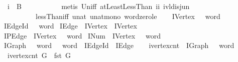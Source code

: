 \begin{isabellebody}
\ \ {\isachardoublequoteopen}i\ {\isasymin}\ {\isacharquery}B{\isachardoublequoteclose}\ \ \ \isanewline
\ \ \ \ \ \ \isamarkupfalse%
\ {\isacharparenleft}metis\ Un{\isacharunderscore}iff\ atLeast{}LessThan\ ii\ ivl{\isacharunderscore}disj{\isacharunderscore}un{\isacharparenleft}{}{\isacharparenright}\ \isanewline
\ \ \ \ \ \ \ \ \ \ lessThan{\isacharunderscore}iff\ unat{\isacharunderscore}{}\ unat{\isacharunderscore}mono\ word{\isacharunderscore}zero{\isacharunderscore}le{\isacharparenright}\isanewline
\ \ \isamarkupfalse%
\isanewline
{}\isamarkupfalse%
%
\endisatagproof
{\isafoldproof}%
%
\isadelimproof
\isanewline
%
\endisadelimproof
\isanewline
\isanewline
{}\isamarkupfalse%
\ IVertex\ {\isacharequal}\ {\isachardoublequoteopen}{}{}\ word{\isachardoublequoteclose}\isanewline
{}\isamarkupfalse%
\ IEdge{\isacharunderscore}Id\ {\isacharequal}\ {\isachardoublequoteopen}{}{}\ word{\isachardoublequoteclose}\isanewline
{}\isamarkupfalse%
\ IEdge\ {\isacharequal}\ {\isachardoublequoteopen}IVertex\ {\isasymtimes}\ IVertex{\isachardoublequoteclose}\ \ \ \ \ \ \ \ \ \ \ \ \ \isanewline
{}\isamarkupfalse%
\ IPEdge\ {\isacharequal}\ {\isachardoublequoteopen}IVertex\ {\isasymRightarrow}\ {}{}\ word{\isachardoublequoteclose}\isanewline
{}\isamarkupfalse%
\ INum\ {\isacharequal}\ {\isachardoublequoteopen}IVertex\ {\isasymRightarrow}\ {}{}\ word{\isachardoublequoteclose}\isanewline
{}\isamarkupfalse%
\ IGraph\ {\isacharequal}\ {\isachardoublequoteopen}{}{}\ word\ {\isasymtimes}\ {}{}\ word\ {\isasymtimes}\ {\isacharparenleft}IEdge{\isacharunderscore}Id\ {\isasymRightarrow}\ IEdge{\isacharparenright}{\isachardoublequoteclose}\isanewline
\isanewline
{}\isamarkupfalse%
\ \isanewline
\ \ ivertex{\isacharunderscore}cnt\ {\isacharcolon}{\isacharcolon}\ {\isachardoublequoteopen}IGraph\ {\isasymRightarrow}\ {}{}\ word{\isachardoublequoteclose}\isanewline
{}\ \isanewline
\ \ {\isachardoublequoteopen}ivertex{\isacharunderscore}cnt\ G\ {\isasymequiv}\ fst\ G{\isachardoublequoteclose}\isanewline
\isanewline
{}\isamarkupfalse%
\ \isanewline

\end{isabellebody}
